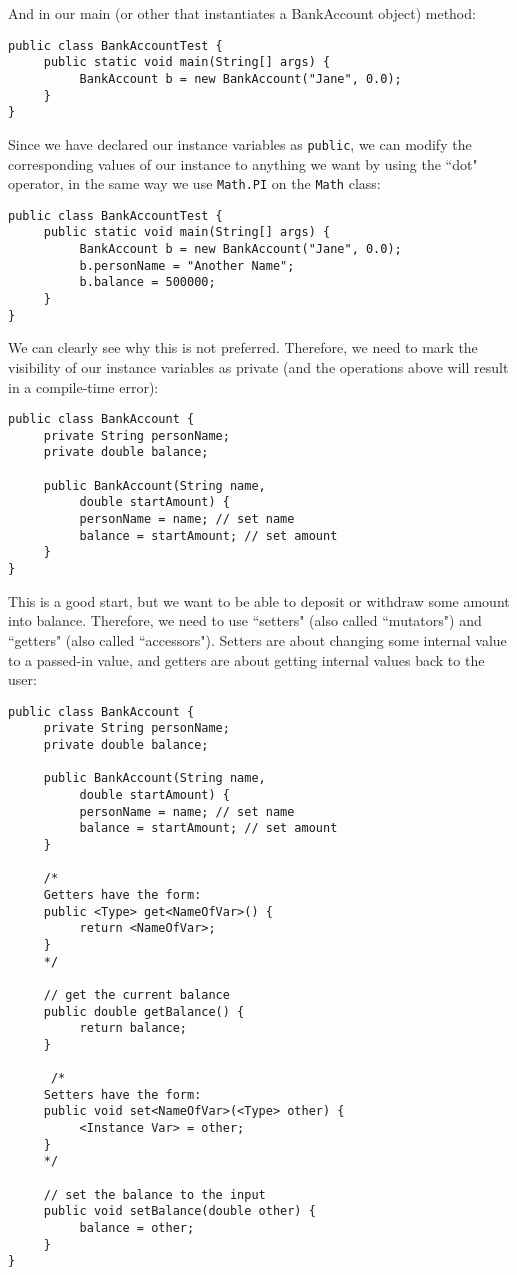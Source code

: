 And in our main (or other that instantiates a BankAccount object) method:
\begin{lstlisting}
public class BankAccountTest {
     public static void main(String[] args) {
          BankAccount b = new BankAccount("Jane", 0.0);
     }
}
\end{lstlisting}
Since we have declared our instance variables as \verb|public|, we can modify the corresponding values of our instance to anything we want by using the ``dot" operator, in the same way we use \verb|Math.PI| on the \verb|Math| class:
\begin{lstlisting}
public class BankAccountTest {
     public static void main(String[] args) {
          BankAccount b = new BankAccount("Jane", 0.0);
          b.personName = "Another Name";
          b.balance = 500000;
     }
}
\end{lstlisting}
We can clearly see why this is not preferred. Therefore, we need to mark the visibility of our instance variables as private (and the operations above will result in a compile-time error):
\begin{lstlisting}
public class BankAccount {
     private String personName;
     private double balance;
     
     public BankAccount(String name, 
          double startAmount) {
          personName = name; // set name
          balance = startAmount; // set amount
     }
}
\end{lstlisting}
This is a good start, but we want to be able to deposit or withdraw some amount into balance. Therefore, we need to use ``setters" (also called ``mutators") and ``getters" (also called ``accessors"). Setters are about changing some internal value to a passed-in value, and getters are about getting internal values back to the user:
\begin{lstlisting}
public class BankAccount {
     private String personName;
     private double balance;
     
     public BankAccount(String name, 
          double startAmount) {
          personName = name; // set name
          balance = startAmount; // set amount
     }
     
     /*
     Getters have the form:
     public <Type> get<NameOfVar>() {
          return <NameOfVar>;
     }
     */
     
     // get the current balance
     public double getBalance() {
          return balance;
     }
     
      /*
     Setters have the form:
     public void set<NameOfVar>(<Type> other) {
          <Instance Var> = other;
     }
     */
     
     // set the balance to the input
     public void setBalance(double other) {
          balance = other;
     }
}
\end{lstlisting}
